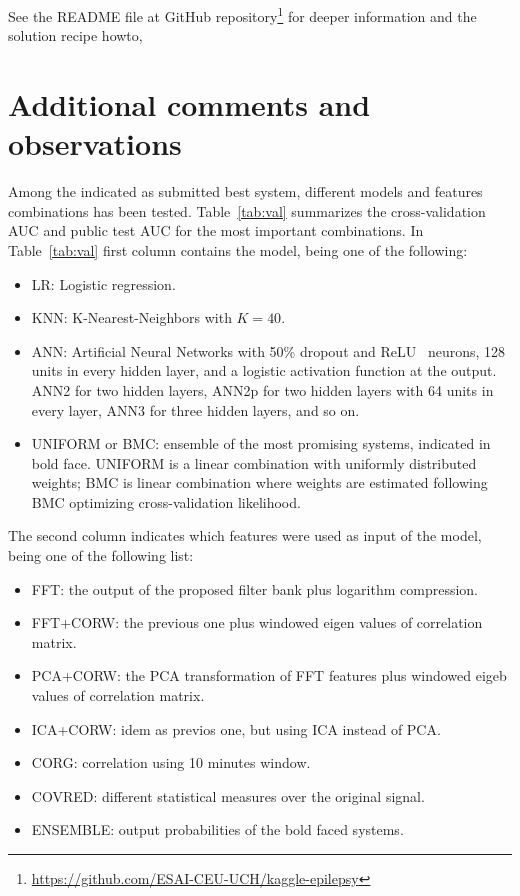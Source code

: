 \documentclass[a4paper,english,twoside]{article}
\begin{document}
See the README file at GitHub
repository\footnote{\url{https://github.com/ESAI-CEU-UCH/kaggle-epilepsy}} for
deeper information and the solution recipe howto,

\section{Additional comments and
  observations}\label{additional-comments-and-observations}

Among the indicated as submitted best system, different models and
features combinations has been tested. Table~\ref{tab:val} summarizes
the cross-validation AUC and public test AUC for the most important
combinations. In Table~\ref{tab:val} first column contains the model, being one
of the following:

\begin{itemize}
\item
  LR: Logistic regression.
\item
  KNN: K-Nearest-Neighbors with $K=40$.
\item ANN: Artificial Neural Networks with 50\% dropout and
  ReLU~\cite{2011:glorot:aistats} neurons, 128 units in every hidden layer, and
  a logistic activation function at the output.  ANN2 for two hidden layers,
  ANN2p for two hidden layers with 64 units in every layer, ANN3 for three
  hidden layers, and so on.
\item
  UNIFORM or BMC: ensemble of the most promising systems, indicated in
  bold face. UNIFORM is a linear combination with uniformly distributed
  weights; BMC is linear combination where weights are estimated
  following BMC optimizing cross-validation likelihood.
\end{itemize}

The second column indicates which features were used as input of the
model, being one of the following list:

\begin{itemize}
\item
  FFT: the output of the proposed filter bank plus logarithm
  compression.
\item
  FFT+CORW: the previous one plus windowed eigen values of correlation
  matrix.
\item
  PCA+CORW: the PCA transformation of FFT features plus windowed eigeb
  values of correlation matrix.
\item
  ICA+CORW: idem as previos one, but using ICA instead of PCA.
\item
  CORG: correlation using 10 minutes window.
\item
  COVRED: different statistical measures over the original signal.
\item
  ENSEMBLE: output probabilities of the bold faced systems.
\end{itemize}
\end{document}

